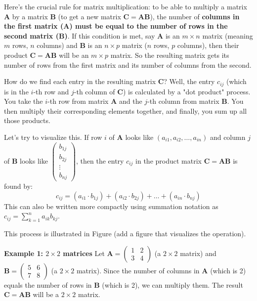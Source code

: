 \documentclass[11pt]{article}
\begin{document}
Here's the crucial rule for matrix multiplication: to be able to multiply a matrix $\mathbf{A}$ by a matrix $\mathbf{B}$ (to get a new matrix $\mathbf{C} = \mathbf{A}\mathbf{B}$), the number of \textbf{columns in the first matrix ($\mathbf{A}$) must be equal to the number of rows in the second matrix ($\mathbf{B}$)}. If this condition is met, say $\mathbf{A}$ is an $m \times n$ matrix (meaning $m$ rows, $n$ columns) and $\mathbf{B}$ is an $n \times p$ matrix ($n$ rows, $p$ columns), then their product $\mathbf{C} = \mathbf{A}\mathbf{B}$ will be an $m \times p$ matrix. So the resulting matrix gets its number of rows from the first matrix and its number of columns from the second.

How do we find each entry in the resulting matrix $\mathbf{C}$? Well, the entry $c_{ij}$ (which is in the $i$-th row and $j$-th column of $\mathbf{C}$) is calculated by a "dot product" process. You take the $i$-th row from matrix $\mathbf{A}$ and the $j$-th column from matrix $\mathbf{B}$. You then multiply their corresponding elements together, and finally, you sum up all those products.

Let's try to visualize this. If row $i$ of $\mathbf{A}$ looks like $(a_{i1}, a_{i2}, \dots, a_{in})$ and column $j$ of $\mathbf{B}$ looks like $\begin{pmatrix} b_{1j} \\ b_{2j} \\ \vdots \\ b_{nj} \end{pmatrix}$, then the entry $c_{ij}$ in the product matrix $\mathbf{C} = \mathbf{A}\mathbf{B}$ is found by:
\[ c_{ij} = (a_{i1} \cdot b_{1j}) + (a_{i2} \cdot b_{2j}) + \dots + (a_{in} \cdot b_{nj}) \]
This can also be written more compactly using summation notation as $c_{ij} = \sum_{k=1}^{n} a_{ik}b_{kj}$.

This process is illustrated in Figure (add a figure that visualizes the operation).

\textbf{Example 1: $2 \times 2$ matrices}
Let $\mathbf{A} = \begin{pmatrix} 1 & 2 \\ 3 & 4 \end{pmatrix}$ (a $2 \times 2$ matrix) and $\mathbf{B} = \begin{pmatrix} 5 & 6 \\ 7 & 8 \end{pmatrix}$ (a $2 \times 2$ matrix).
Since the number of columns in $\mathbf{A}$ (which is 2) equals the number of rows in $\mathbf{B}$ (which is 2), we can multiply them. The result $\mathbf{C} = \mathbf{A}\mathbf{B}$ will be a $2 \times 2$ matrix.
\end{document}
